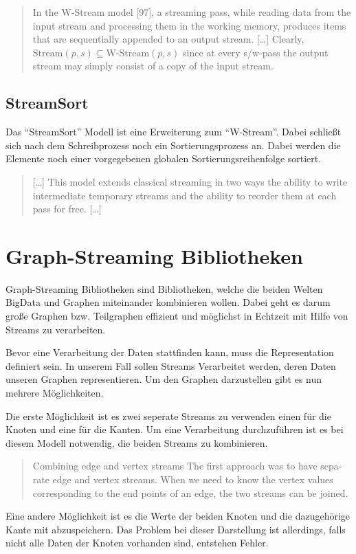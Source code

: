 \foreignblockquote{english}[\cite{Ribichini2007}]{
In the W-Stream model [97], a streaming pass, while reading data from
the input stream and processing them in the working memory, produces items
that are sequentially appended to an output stream. [\dots]
Clearly, $\text{Stream}(p, s) \subseteq \text{W-Stream}(p, s)$ since at every
s/w-pass the output stream may simply consist of a copy of the input stream.
}

\subsection{StreamSort}
Das \enquote{StreamSort} Modell ist eine Erweiterung zum \enquote{W-Stream}.
Dabei schließt sich nach dem Schreibprozess noch ein Sortierungsprozess an. Dabei
werden die Elemente noch einer vorgegebenen globalen Sortierungsreihenfolge
sortiert.

\foreignblockquote{english}[\cite{Ribichini2007}]{
[\dots] This model extends classical streaming in two ways the ability to write
intermediate temporary streams and the ability to reorder them at each pass for
free. [\dots]
}

\section{Graph-Streaming Bibliotheken}
Graph-Streaming Bibliotheken sind Bibliotheken, welche die beiden Welten
\gls{BigData} und Graphen miteinander kombinieren wollen. Dabei geht es darum
große Graphen bzw. Teilgraphen effizient und möglichst in Echtzeit mit Hilfe von
Streams zu verarbeiten.

Bevor eine Verarbeitung der Daten stattfinden kann, muss die Representation
definiert sein. In unserem Fall sollen Streams Verarbeitet werden, deren Daten
unseren Graphen representieren. Um den Graphen darzustellen gibt es nun mehrere
Möglichkeiten.

Die erste Möglichkeit ist es zwei seperate Streams zu verwenden einen für die
Knoten und eine für die Kanten. Um eine Verarbeitung durchzuführen ist es bei
diesem Modell notwendig, die beiden Streams zu kombinieren.

\foreignblockquote{english}[\cite{Bali2015}]{
Combining edge and vertex streams The first approach was to have separate
edge and vertex streams. When we need to know the vertex values corresponding
to the end points of an edge, the two streams can be joined.
}

Eine andere Möglichkeit ist es die Werte der beiden Knoten und die dazugehörige
Kante mit abzuspeichern. Das Problem bei dieser Darstellung ist allerdings, 
falls nicht alle Daten der Knoten vorhanden sind, entstehen Fehler.

